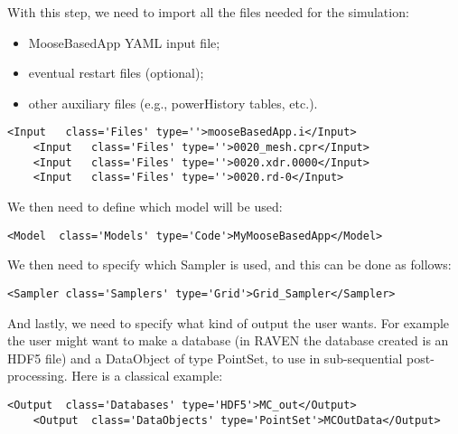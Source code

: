 With this step, we need to import all the files needed for the simulation:
\begin{itemize}
  \item MooseBasedApp YAML input file;
  \item eventual restart files (optional);
  \item other auxiliary files (e.g., powerHistory tables, etc.). 
\end{itemize}
\begin{lstlisting}[style=XML,morekeywords={name,class,type}]
    <Input   class='Files' type=''>mooseBasedApp.i</Input>
    <Input   class='Files' type=''>0020_mesh.cpr</Input>
    <Input   class='Files' type=''>0020.xdr.0000</Input>
    <Input   class='Files' type=''>0020.rd-0</Input>
\end{lstlisting}
We then need to define which model will be used:
\begin{lstlisting}[style=XML]
    <Model  class='Models' type='Code'>MyMooseBasedApp</Model>
\end{lstlisting}
We then need to specify which Sampler is used, and this can be done as follows:
\begin{lstlisting}[style=XML]
    <Sampler class='Samplers' type='Grid'>Grid_Sampler</Sampler>
\end{lstlisting}
And lastly, we need to specify what kind of output the user wants.
%
For example the user might want to make a database (in RAVEN the database
created is an HDF5 file) and a DataObject of type PointSet, to use in sub-sequential
post-processing.
%
Here is a classical example:
\begin{lstlisting}[style=XML,morekeywords={class,type}]
    <Output  class='Databases' type='HDF5'>MC_out</Output>
    <Output  class='DataObjects' type='PointSet'>MCOutData</Output>
\end{lstlisting}


